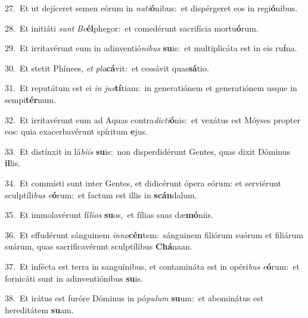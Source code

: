 {\numbfont\textcolor{\numbcolor}{27.}}~Et ut dejíceret semen eórum in \textit{na}\-\textit{ti}\textbf{ó}nibus:~\star et dispérgeret eos in regi\-\textbf{ó}\-nibus.\par
{\numbfont\textcolor{\numbcolor}{28.}}~Et initiáti \textit{sunt} \textit{Be}\-\textbf{él}phegor:~\star et comedérunt sacrifícia mortu\-\textbf{ó}\-rum.\par
{\numbfont\textcolor{\numbcolor}{29.}}~Et irritavérunt eum in adinventió\-\textit{ni}\-\textit{bus} \textbf{su}\-is:~\star et multiplicáta est in eis ru\-\textbf{í}\-na.\par
{\numbfont\textcolor{\numbcolor}{30.}}~Et stetit Phínees, \textit{et} \textit{pla}\-\textbf{cá}vit:~\star et cessávit quas\-\textbf{sá}\-tio.\par
{\numbfont\textcolor{\numbcolor}{31.}}~Et reputátum est ei \textit{in} \textit{jus}\-\textbf{tí}tiam:~\star in generatiónem et generatiónem usque in sempi\-\textbf{tér}\-num.\par
{\numbfont\textcolor{\numbcolor}{32.}}~Et irritavérunt eum ad Aquas contra\-\textit{dic}\-\textit{ti}\textbf{ó}nis:~\star et vexátus est Móyses propter eos: quia exacerbavérunt spíritum \textbf{e}\-jus.\par
{\numbfont\textcolor{\numbcolor}{33.}}~Et distínxit in lá\-\textit{bi}\-\textit{is} \textbf{su}\-is:~\star non disperdidérunt Gentes, quas dixit Dóminus \textbf{il}\-lis.\par
{\numbfont\textcolor{\numbcolor}{34.}}~Et commísti sunt inter Gentes, et didicérunt ópera eórum: et serviérunt sculptíli\textit{bus} \textit{e}\-\textbf{ó}rum:~\star et factum est illis in \textbf{scán}\-dalum.\par
{\numbfont\textcolor{\numbcolor}{35.}}~Et immolavérunt fí\-\textit{li}\-\textit{os} \textbf{su}\-os,~\star et fílias suas dæ\-\textbf{mó}\-niis.\par
{\numbfont\textcolor{\numbcolor}{36.}}~Et effudérunt sánguinem \textit{in}\-\textit{no}\textbf{cén}tem:~\star sánguinem filiórum suórum et filiárum suárum, quas sacrificavérunt sculptílibus \textbf{Chá}\-naan.\par
{\numbfont\textcolor{\numbcolor}{37.}}~Et infécta est terra in sanguínibus, et contamináta est in opéri\textit{bus} \textit{e}\-\textbf{ó}rum:~\star et fornicáti sunt in adinventiónibus \textbf{su}\-is.\par
{\numbfont\textcolor{\numbcolor}{38.}}~Et irátus est furóre Dóminus in pó\-\textit{pu}\-\textit{lum} \textbf{su}\-um:~\star et abominátus est hereditátem \textbf{su}\-am.\par
